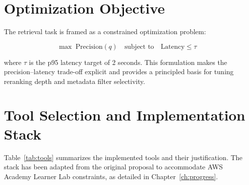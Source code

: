 \documentclass[12pt,a4paper]{report}
\begin{document}
\section{Optimization Objective}
\label{sec:optimization}

The retrieval task is framed as a constrained optimization problem:

\begin{equation}
  \max \; \text{Precision}(q) \quad \text{subject to} \quad \text{Latency} \leq \tau
  \label{eq:opt}
\end{equation}

where $\tau$ is the p95 latency target of 2 seconds. This formulation makes the precision--latency trade-off explicit and provides a principled basis for tuning reranking depth and metadata filter selectivity.

\section{Tool Selection and Implementation Stack}
\label{sec:tools}

Table~\ref{tab:tools} summarizes the implemented tools and their justification. The stack has been adapted from the original proposal to accommodate AWS Academy Learner Lab constraints, as detailed in Chapter~\ref{ch:progress}.
\end{document}
